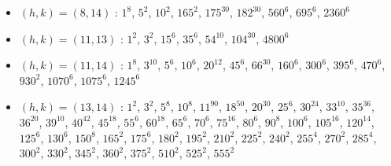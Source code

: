 \begin{itemize}
\item $(h,k)=(8,14)$ : $1^{8}$, $5^{2}$, $10^{2}$, $165^{2}$, $175^{30}$, $182^{30}$, $560^{6}$, $695^{6}$, $2360^{6}$
\item $(h,k)=(11,13)$ : $1^{2}$, $3^{2}$, $15^{6}$, $35^{6}$, $54^{10}$, $104^{30}$, $4800^{6}$
\item $(h,k)=(11,14)$ : $1^{8}$, $3^{10}$, $5^{6}$, $10^{6}$, $20^{12}$, $45^{6}$, $66^{30}$, $160^{6}$, $300^{6}$, $395^{6}$, $470^{6}$, $930^{2}$, $1070^{6}$, $1075^{6}$, $1245^{6}$
\item $(h,k)=(13,14)$ : $1^{2}$, $3^{2}$, $5^{8}$, $10^{8}$, $11^{90}$, $18^{50}$, $20^{30}$, $25^{6}$, $30^{24}$, $33^{10}$, $35^{36}$, $36^{20}$, $39^{10}$, $40^{42}$, $45^{18}$, $55^{6}$, $60^{18}$, $65^{6}$, $70^{6}$, $75^{16}$, $80^{6}$, $90^{8}$, $100^{6}$, $105^{16}$, $120^{14}$, $125^{6}$, $130^{6}$, $150^{8}$, $165^{2}$, $175^{6}$, $180^{2}$, $195^{2}$, $210^{2}$, $225^{2}$, $240^{2}$, $255^{4}$, $270^{2}$, $285^{4}$, $300^{2}$, $330^{2}$, $345^{2}$, $360^{2}$, $375^{2}$, $510^{2}$, $525^{2}$, $555^{2}$
\end{itemize}

